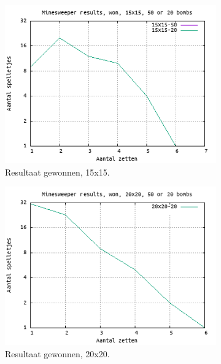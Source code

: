 \documentclass[10pt]{article}
\begin{document}
\begin{figure}[H]
\begin{subfigure}{.49\textwidth}
    \includegraphics[width=1\linewidth]{plot_15_15_won}
    \caption{Resultaat gewonnen, 15x15. }
    \label{fig:plot_15_15_won}
  \end{subfigure}
  \begin{subfigure}{.49\textwidth}
    \centering
    \includegraphics[width=1\linewidth]{plot_20_20_won}
    \caption{Resultaat gewonnen, 20x20. }
    \label{fig:plot_20_20_won}
  \end{subfigure}
  \begin{subfigure}{.49\textwidth}
    \centering

\end{subfigure}
\end{figure}
\end{document}
